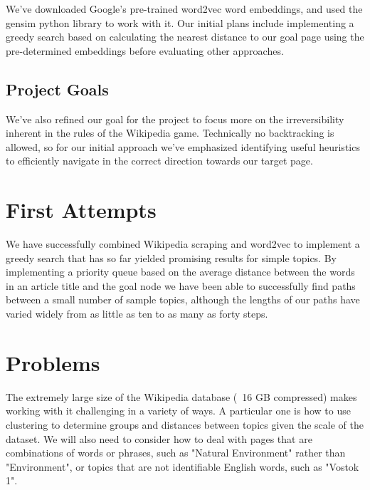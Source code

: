 \documentclass[11pt]{article}
\begin{document}
We've downloaded Google's pre-trained word2vec word embeddings, and used the gensim python library to work with it. Our initial plans include implementing a greedy search based on calculating the nearest distance to our goal page using the pre-determined embeddings before evaluating other approaches.

\subsection{Project Goals}

We've also refined our goal for the project to focus more on the irreversibility inherent in the rules of the Wikipedia game. Technically no backtracking is allowed, so for our initial approach we've emphasized identifying useful heuristics to efficiently navigate in the correct direction towards our target page.

\section{First Attempts}
We have successfully combined Wikipedia scraping and word2vec to implement a greedy search that has so far yielded promising results for simple topics. By implementing a priority queue based on the average distance between the words in an article title and the goal node we have been able to successfully find paths between a small number of sample topics, although the lengths of our paths have varied widely from as little as ten to as many as forty steps.

\section{Problems}

The extremely large size of the Wikipedia database (~16 GB compressed) makes working with it challenging in a variety of ways. A particular one is how to use clustering to determine groups and distances between topics given the scale of the dataset. We will also need to consider how to deal with pages that are combinations of words or phrases, such as "Natural Environment" rather than "Environment", or topics that are not identifiable English words, such as "Vostok 1".
\end{document}
